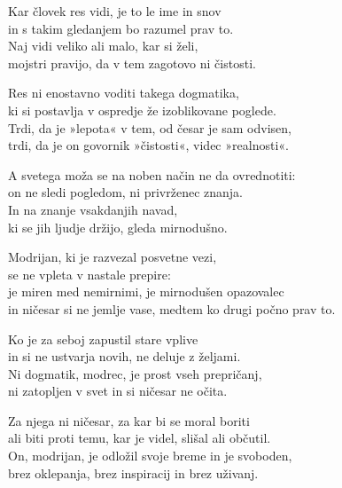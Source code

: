 Kar človek res vidi, je to le ime in snov\\
in s takim gledanjem bo razumel prav to.\\
Naj vidi veliko ali malo, kar si želi,\\
mojstri pravijo, da v tem zagotovo ni čistosti.

Res ni enostavno voditi takega dogmatika,\\
ki si postavlja v ospredje že izoblikovane poglede.\\
Trdi, da je »lepota« v tem, od česar je sam odvisen,\\
trdi, da je on govornik »čistosti«, videc »realnosti«.

A svetega moža se na noben način ne da ovrednotiti:\\
on ne sledi pogledom, ni privrženec znanja.\\
In na znanje vsakdanjih navad,\\
ki se jih ljudje držijo, gleda mirnodušno.

Modrijan, ki je razvezal posvetne vezi,\\
se ne vpleta v nastale prepire:\\
je miren med nemirnimi, je mirnodušen opazovalec\\
in ničesar si ne jemlje vase, medtem ko drugi počno prav to.

Ko je za seboj zapustil stare vplive\\
in si ne ustvarja novih, ne deluje z željami.\\
Ni dogmatik, modrec, je prost vseh prepričanj,\\
ni zatopljen v svet in si ničesar ne očita.

Za njega ni ničesar, za kar bi se moral boriti\\
ali biti proti temu, kar je videl, slišal ali občutil.\\
On, modrijan, je odložil svoje breme in je svoboden,\\
brez oklepanja, brez inspiracij in brez uživanj.

